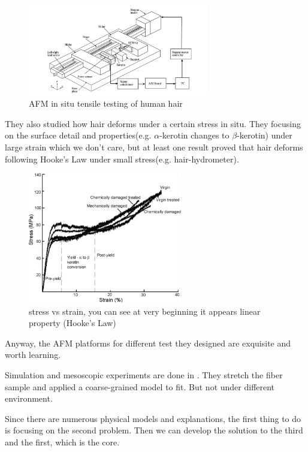 \documentclass{article}
\begin{document}
\begin{figure}[H]
    \centering
\includegraphics[width=0.7\textwidth]{in situ tensile afm.png}
    \caption{AFM in situ tensile testing of human hair\citep{seshadri2008situ}}
\end{figure} 
They also studied how hair deforms under a certain stress in situ\citep{seshadri2008situ}. They focusing on the surface detail and properties(e.g. $\alpha$-kerotin changes to $\beta$-kerotin) under large strain which we don't care, but at least one result proved that hair deforms following Hooke's Law under small stress(e.g. hair-hydrometer).
\begin{figure}[H]
    \centering
\includegraphics[width=0.6\textwidth]{stress strain.jpg}
    \caption{stress vs strain, you can see at very beginning it appears linear property (Hooke's Law)\citep{seshadri2008situ}}
\end{figure} 
Anyway, the AFM platforms for different test they designed are exquisite and  worth learning.


Simulation and mesoscopic experiments are done in \citep{chou2015mechanics}. They stretch the fiber sample and applied a coarse-grained model to fit.  But not under different environment.

Since there are numerous physical models and explanations, the first thing to do is focusing on the second problem. Then we can develop the solution to the third and the first, which is the core.
\end{document}
